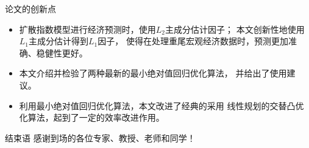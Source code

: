 \begin{frame}{论文的创新点}
    \begin{itemize}
        \item 扩散指数模型进行经济预测时，使用$L_2$主成分估计因子；
        本文创新性地使用$L_1$主成分估计得到$L_1$因子，
        使得在处理重尾宏观经济数据时，预测更加准确、稳健性更好。
        \item 本文介绍并检验了两种最新的最小绝对值回归优化算法，
        并给出了使用建议。
        \item 利用最小绝对值回归优化算法，本文改进了经典的采用
        线性规划的交替凸优化算法，起到了一定的效率改进作用。
    \end{itemize}
\end{frame}



\begin{frame}{结束语}
    \centering
    \Large
    感谢到场的各位专家、教授、老师和同学！
\end{frame}